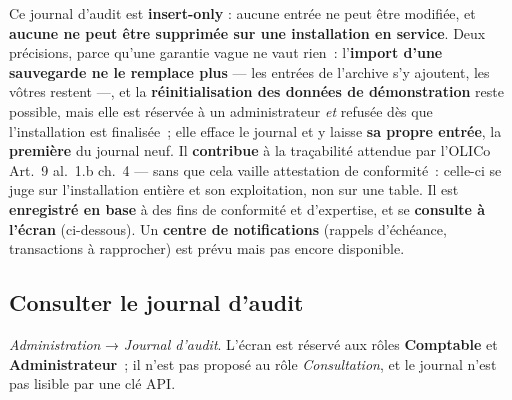 \documentclass[a4paper,11pt,oneside]{article}
\begin{document}
\begin{keshnote}
Ce journal d'audit est \textbf{insert-only} : aucune entrée ne peut être modifiée,
et \textbf{aucune ne peut être supprimée sur une installation en service}. Deux
précisions, parce qu'une garantie vague ne vaut rien~: l'\textbf{import d'une
sauvegarde ne le remplace plus} --- les entrées de l'archive s'y ajoutent, les vôtres
restent ---, et la \textbf{réinitialisation des données de démonstration} reste
possible, mais elle est réservée à un administrateur \emph{et} refusée dès que
l'installation est finalisée~; elle efface le journal et y laisse \textbf{sa propre
entrée}, la \textbf{première} du journal neuf. Il \textbf{contribue} à la traçabilité attendue par
l'OLICo Art.~9 al.~1.b ch.~4 --- sans que cela vaille attestation de conformité~:
celle-ci se juge sur l'installation entière et son exploitation, non sur une table.
Il est \textbf{enregistré en base} à des fins de conformité et d'expertise, et se
\textbf{consulte à l'écran} (ci-dessous). Un \textbf{centre de notifications} (rappels d'échéance,
transactions à rapprocher) est prévu mais pas encore disponible.
\end{keshnote}

\subsection{Consulter le journal d'audit}

\emph{Administration} → \emph{Journal d'audit}. L'écran est réservé aux rôles
\textbf{Comptable} et \textbf{Administrateur}~; il n'est pas proposé au rôle
\emph{Consultation}, et le journal n'est pas lisible par une clé API.
\end{document}
